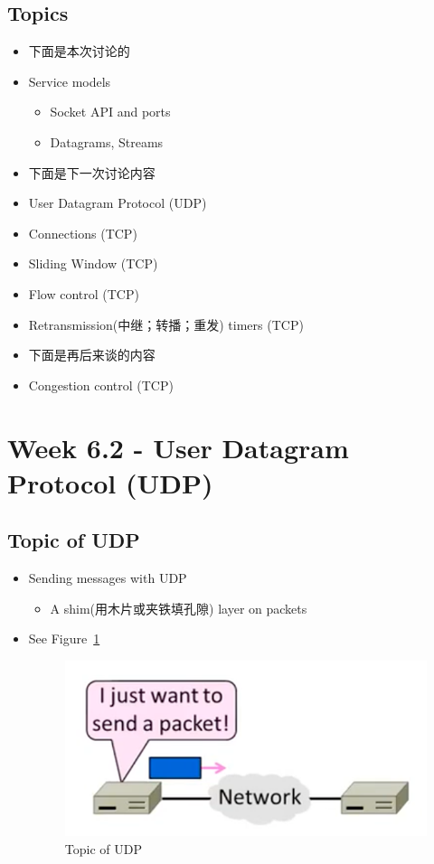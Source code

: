 \documentclass[12pt]{ctexart}   %
\begin{document}
	\subsection{Topics}
	\begin{itemize}
		\item {\color{pink} 下面是本次讨论的}
		\item Service models
		\begin{itemize}
			\item Socket API and ports
			\item Datagrams, Streams
		\end{itemize}
		
		\item {\color{pink} 下面是下一次讨论内容}
		\item User Datagram Protocol (UDP)
		\item Connections (TCP)
		\item Sliding Window (TCP)
		\item Flow control (TCP)
		\item Retransmission(中继；转播；重发) timers (TCP)
		
		\item {\color{pink} 下面是再后来谈的内容}
		\item {\color{gray} Congestion control (TCP) }
	\end{itemize}
	
\section{ Week 6.2 - User Datagram Protocol (UDP) }
	\subsection{Topic of UDP}
	\begin{itemize}
		\item Sending messages with UDP
		\begin{itemize}
			\item A shim(用木片或夹铁填孔隙) layer on packets
		\end{itemize}
		\item See Figure~\ref{fig:6-2-1}
		 
		 \begin{figure}[h!] %
		\centering
		 \includegraphics[scale=0.7]{images/6-2-1}
		\caption{ Topic of UDP }
		 \label{fig:6-2-1}
		 \end{figure}
	\end{itemize}
	
\end{document}
